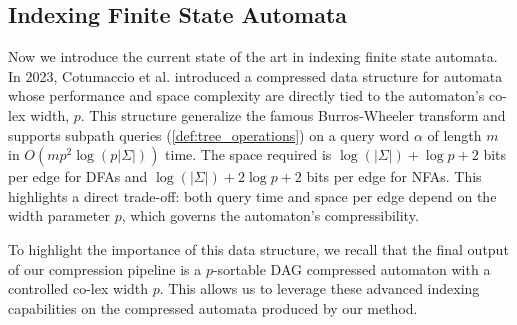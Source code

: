 \subsection{Indexing Finite State Automata}
Now we introduce the current state of the art in indexing finite state automata. In 2023, Cotumaccio et al. \cite{cotumaccio2021indexing} introduced a compressed data structure for automata whose performance and space complexity are directly tied to the automaton's co-lex width, $p$. This structure generalize the famous Burros-Wheeler transform \cite{burrows1994block} and supports subpath queries (\cref{def:tree_operations}) on a query word $\alpha$ of length $m$ in $O(mp^2\log(p|\Sigma|))$ time. The space required is $\log(|\Sigma|) + \log p +2$ bits per edge for DFAs and $\log(|\Sigma|) + 2\log p +2$ bits per edge for NFAs. This highlights a direct trade-off: both query time and space per edge depend on the width parameter $p$, which governs the automaton's compressibility.

To highlight the importance of this data structure, we recall that the final output of our compression pipeline is a $p$-sortable DAG compressed automaton with a controlled co-lex width $p$. This allows us to leverage these advanced indexing capabilities on the compressed automata produced by our method.